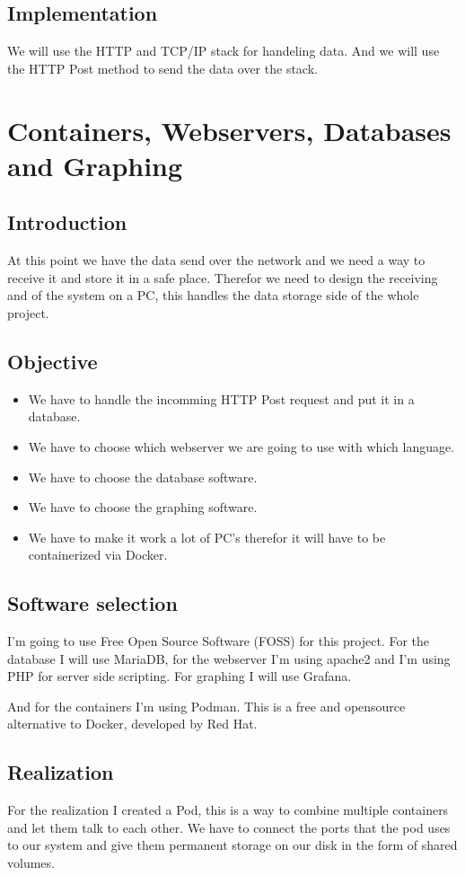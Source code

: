 \documentclass[a4paper,twoside, 12pt]{report}
\theoremstyle{break}
\begin{document}
\subsection{Implementation}
We will use the HTTP and TCP/IP stack for handeling data. And we will use the HTTP Post method to send the data over the stack.

\vfill
\eject

\section{Containers, Webservers, Databases and Graphing}
\subsection{Introduction}
At this point we have the data send over the network and we need a way to receive it and store it in a safe place. Therefor we need to design the receiving and of the system on a PC, this handles the data storage side of the whole project.

\subsection{Objective}
\begin{itemize}
\item We have to handle the incomming HTTP Post request and put it in a database.
\item We have to choose which webserver we are going to use with which language.
\item We have to choose the database software.
\item We have to choose the graphing software.
\item We have to make it work a lot of PC's therefor it will have to be containerized via Docker.
\end{itemize}

\subsection{Software selection}
I'm going to use Free Open Source Software (FOSS) for this project.
For the database I will use MariaDB, for the webserver I'm using apache2 and I'm using PHP for server side scripting. For graphing I will use Grafana.

And for the containers I'm using Podman. This is a free and opensource alternative to Docker, developed by Red Hat.

\subsection{Realization}
For the realization I created a Pod, this is a way to combine multiple containers and let them talk to each other. We have to connect the ports that the pod uses to our system and give them permanent storage on our disk in the form of shared volumes.
\end{document}

